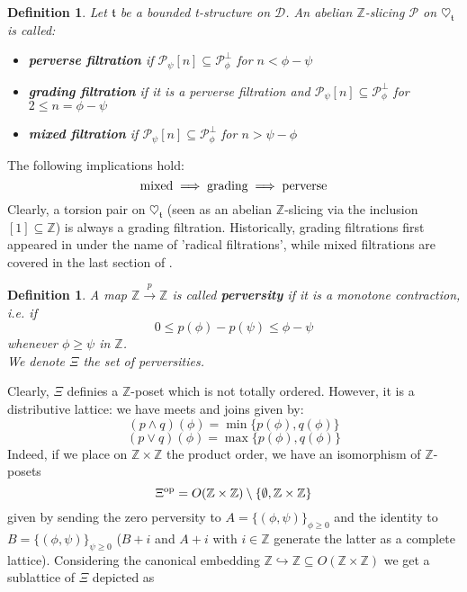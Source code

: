 \documentclass{article}
\newtheorem{defn}[thm]{Definition}
\theoremstyle{definition}
\begin{document}
\begin{defn}
Let $\mathfrak{t}$ be a bounded t-structure on $\mathscr{D}$. An abelian $\mathbb{Z}$-slicing $\mathscr{P}$ on $\heartsuit_{\mathfrak{t}}$ is called:
\begin{itemize}
\item \textbf{perverse filtration} if $\mathscr{P}_{\psi}[n] \subseteq \mathscr{P}_{\phi}^{\perp}$ for $n < \phi - \psi$
\item \textbf{grading filtration} if it is a perverse filtration and $\mathscr{P}_{\psi}[n] \subseteq \mathscr{P}_{\phi }^{\perp}$ for $2 \le n = \phi - \psi$ 
\item \textbf{mixed filtration} if $\mathscr{P}_{\psi}[n] \subseteq \mathscr{P}_{\phi }^{\perp}$ for $n > \psi - \phi$ 
\end{itemize} 
\end{defn}

The following implications hold: 
$$\textnormal{mixed} \implies \textnormal{grading} \implies \textnormal{perverse} $$
Clearly, a torsion pair on $\heartsuit_{\mathfrak{t}}$ (seen as an abelian $\mathbb{Z}$-slicing via the inclusion $[1] \subseteq \mathbb{Z}$) is always a grading filtration. Historically, grading filtrations first appeared in \cite{ekh} under the name of 'radical filtrations', while mixed filtrations are covered in the last section of \cite{kos}.

\begin{defn}
A map $\mathbb{Z} \overset{p}{\longrightarrow} \mathbb{Z}$ is called \textbf{perversity} if it is a monotone contraction, i.e. if $$0 \le p(\phi) - p(\psi) \le \phi - \psi$$ 
whenever $\phi \ge \psi$  in $\mathbb{Z}$. \\
We denote $\Xi$ the set of perversities. 
\end{defn}

Clearly, $\Xi$ definies a $\mathbb{Z}$-poset which is not totally ordered. However, it is a distributive lattice: we have meets and joins given by: $$(p\land q)(\phi)=\min\{p(\phi), q(\phi) \}$$ $$(p\lor q)(\phi)=\max\{p(\phi), q(\phi) \}$$
Indeed, if we place on $\mathbb{Z}\times \mathbb{Z}$ the product order, we have an isomorphism of $\mathbb{Z}$-posets $$\Xi^{\textnormal{op}}=O(\mathbb{Z}\times \mathbb{Z})\setminus \{ \emptyset, \mathbb{Z} \times \mathbb{Z} \} $$
given by sending the zero perversity to $A=\{ (\phi,\psi) \}_{\phi \ge 0} $ and the identity to $B=\{ (\phi,\psi) \}_{\psi \ge 0}$ ($B+i$ and $A+i$ with $i \in \mathbb{Z}$ generate the latter as a complete lattice). Considering the canonical embedding $\mathbb{Z} \hookrightarrow \mathbb{Z}  \subseteq O(\mathbb{Z} \times \mathbb{Z})$ we get a sublattice of $\Xi$ depicted as 
\end{document}
